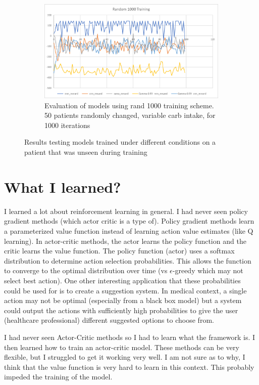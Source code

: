 \documentclass[11pt]{article}
\begin{document}
\begin{figure}
    \begin{subfigure}{0.62 \textwidth}
        \centering
        \includegraphics[width=\textwidth]{rand1000.png}
        \caption{Evaluation of models using rand 1000 training scheme. 50 patients randomly changed, variable carb intake, for 1000 iterations}
        \label{fig:rand1000}
    \end{subfigure}
    \caption{Results testing models trained under different conditions on a patient that was unseen during training}
    \label{fig:all_results}
\end{figure}

\section{What I learned?}
I learned a lot about reinforcement learning in general.
I had never seen policy gradient methods (which actor critic is a type of).
Policy gradient methods learn a parameterized value function instead of learning action value estimates (like Q learning).
In actor-critic methods, the actor learns the policy function and the critic learns the value function.
The policy function (actor) uses a softmax distribution to determine action selection probabilities.
This allows the function to converge to the optimal distribution over time (vs $\epsilon$-greedy which may not select best action).
One other interesting application that these probabilities could be used for is to create a suggestion system.
In medical context, a single action may not be optimal (especially from a black box model) but a system could output the actions with sufficiently high probabilities
to give the user (healthcare professional) different suggested options to choose from.

I had never seen Actor-Critic methods so I had to learn what the framework is.
I then learned how to train an actor-critic model. 
These methods can be very flexible, but I struggled to get it working very well.
I am not sure as to why, I think that the value function is very hard to learn in this context.
This probably impeded the training of the model. 
\end{document}
